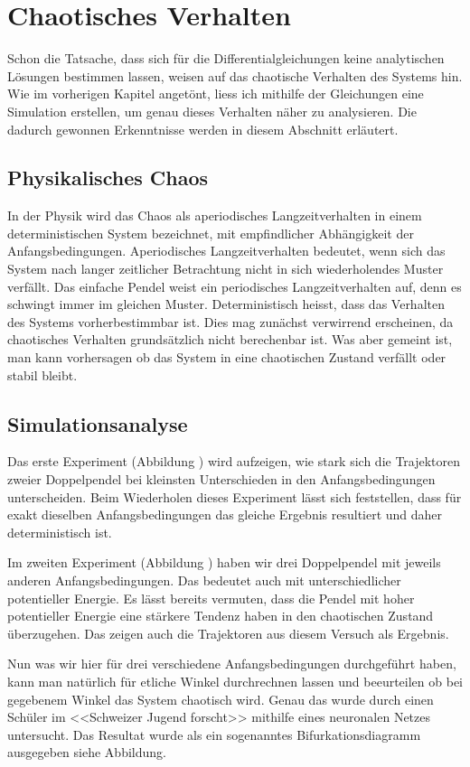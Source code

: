 \section{Chaotisches Verhalten}
Schon die Tatsache, dass sich für die Differentialgleichungen keine 
analytischen Lösungen bestimmen lassen, weisen auf das chaotische Verhalten
des Systems hin.
Wie im vorherigen Kapitel angetönt, liess ich mithilfe der Gleichungen eine Simulation
erstellen, um genau dieses Verhalten näher zu analysieren.
Die dadurch gewonnen Erkenntnisse werden in diesem Abschnitt erläutert.

\subsection{Physikalisches Chaos}
In der Physik wird das Chaos als aperiodisches Langzeitverhalten in einem deterministischen
System bezeichnet, mit empfindlicher Abhängigkeit der Anfangsbedingungen.
Aperiodisches Langzeitverhalten bedeutet, wenn sich das System nach langer zeitlicher Betrachtung
nicht in sich wiederholendes Muster verfällt.
Das einfache Pendel weist ein periodisches Langzeitverhalten auf, denn es schwingt immer im gleichen 
Muster.
Deterministisch heisst, dass das Verhalten des Systems vorherbestimmbar ist.
Dies mag zunächst verwirrend erscheinen, da chaotisches Verhalten grundsätzlich nicht
berechenbar ist.
Was aber gemeint ist, man kann vorhersagen ob das System in eine chaotischen Zustand 
verfällt oder stabil bleibt.

\subsection{Simulationsanalyse}
Das erste Experiment (Abbildung ) wird aufzeigen, wie stark sich die Trajektoren zweier Doppelpendel 
bei kleinsten Unterschieden in den Anfangsbedingungen unterscheiden.
Beim Wiederholen dieses Experiment lässt sich feststellen, dass für exakt dieselben Anfangsbedingungen
das gleiche Ergebnis resultiert und daher deterministisch ist.

Im zweiten Experiment (Abbildung ) haben wir drei Doppelpendel mit jeweils anderen Anfangsbedingungen.
Das bedeutet auch mit unterschiedlicher potentieller Energie.
Es lässt bereits vermuten, dass die Pendel mit hoher potentieller Energie eine stärkere Tendenz haben
in den chaotischen Zustand überzugehen.
Das zeigen auch die Trajektoren aus diesem Versuch als Ergebnis.

Nun was wir hier für drei verschiedene Anfangsbedingungen durchgeführt haben, kann man natürlich
für etliche Winkel durchrechnen lassen und beeurteilen ob bei gegebenem Winkel das System chaotisch wird.
Genau das wurde durch einen Schüler im <<Schweizer Jugend forscht>> mithilfe eines neuronalen Netzes
untersucht. %
Das Resultat wurde als ein sogenanntes Bifurkationsdiagramm ausgegeben siehe Abbildung.
